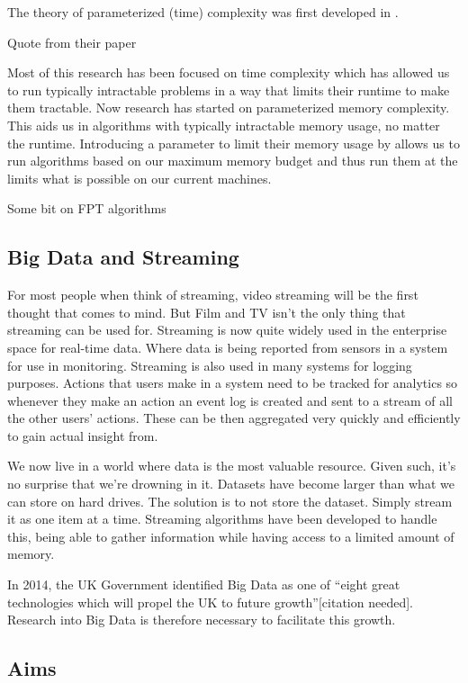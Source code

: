 The theory of parameterized (time) complexity was first developed in
\cite{downey1999parameterized}.

Quote from their paper

Most of this research has been focused on time complexity which has
allowed us to run typically intractable problems in a way that limits
their runtime to make them tractable. Now research has started on
parameterized memory complexity. This aids us in algorithms with
typically intractable memory usage, no matter the runtime. Introducing a
parameter to limit their memory usage by allows us to run algorithms
based on our maximum memory budget and thus run them at the limits what
is possible on our current machines.

Some bit on FPT algorithms

\subsection{Big Data and Streaming}

For most people when think of streaming, video streaming will be the
first thought that comes to mind. But Film and TV isn't the only thing
that streaming can be used for. Streaming is now quite widely used in
the enterprise space for real-time data. Where data is being reported
from sensors in a system for use in monitoring. Streaming is also used
in many systems for logging purposes. Actions that users make in a
system need to be tracked for analytics so whenever they make an action
an event log is created and sent to a stream of all the other users'
actions. These can be then aggregated very quickly and efficiently to
gain actual insight from.

We now live in a world where data is the most valuable resource. Given
such, it's no surprise that we're drowning in it. Datasets have become
larger than what we can store on hard drives. The solution is to not
store the dataset. Simply stream it as one item at a time. Streaming
algorithms have been developed to handle this, being able to gather
information while having access to a limited amount of memory.

In 2014, the UK Government identified Big Data as one of ``eight great
technologies which will propel the UK to future growth''{[}citation
needed{]}. Research into Big Data is therefore necessary to facilitate
this growth.

\subsection{Aims}

